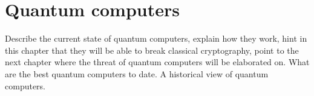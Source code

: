 \chapter{Quantum computers}

Describe the current state of quantum computers, explain how they work, hint in this chapter that they will be able to break classical cryptography, point to the next chapter where the threat of quantum computers will be elaborated on. What are the best quantum computers to date. A historical view of quantum computers.
